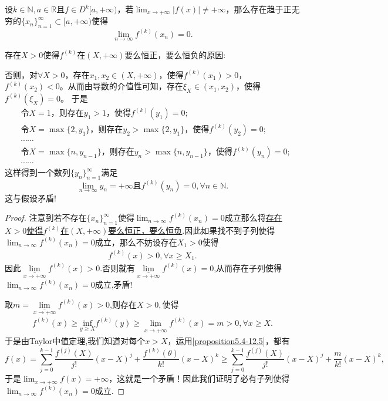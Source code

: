 \documentclass[../../main.tex]{subfiles}%
\begin{document}
\begin{proposition}\label{proposition:函数不爆破则各阶导数必然有趋于 0 的子列}
设\(k\in\mathbb{N},a\in\mathbb{R}\)且\(f\in D^{k}[a,+\infty)\)，若\(\lim_{x\rightarrow +\infty}|f(x)|\neq +\infty\)，那么存在趋于正无穷的\(\{x_n\}_{n = 1}^{\infty}\subset [a,+\infty)\)使得
\[
\lim_{n\rightarrow\infty}f^{(k)}(x_n)=0.
\]
\end{proposition}
\begin{note}
\hypertarget{proposition5.4由假设得到这个结论的原因}{存在\(X > 0\)使得\(f^{(k)}\)在\((X,+\infty)\)要么恒正，要么恒负的原因:}否则，对\(\forall X>0\)，存在\(x_1,x_2\in (X,+\infty)\)，使得\(f^{(k)}(x_1)>0\)，\(f^{(k)}(x_2)<0\)。从而由导数的介值性可知，存在\(\xi_X\in (x_1,x_2)\)，使得\(f^{(k)}(\xi_X) = 0\)。
于是
\begin{align*}
&\text{令}X = 1\text{，则存在}y_1>1\text{，使得}f^{(k)}(y_1)=0;\\
&\text{令}X=\max\{2,y_1\}\text{，则存在}y_2>\max\{2,y_1\}\text{，使得}f^{(k)}(y_2)=0;\\
&\cdots\cdots\\
&\text{令}X=\max\{n,y_{n - 1}\}\text{，则存在}y_n>\max\{n,y_{n - 1}\}\text{，使得}f^{(k)}(y_n)=0;\\
&\cdots\cdots
\end{align*}
这样得到一个数列\(\{y_n\}_{n = 1}^{\infty}\)满足
\[
\lim_{n\rightarrow \infty}y_n=+\infty\text{且}f^{(k)}(y_n)=0,\forall n\in \mathbb{N}.
\]
这与假设矛盾!
\end{note}
\begin{proof}

注意到若不存在\(\{x_n\}_{n = 1}^{\infty}\)使得\(\lim_{n\rightarrow\infty}f^{(k)}(x_n)=0\)成立那么将\hyperlink{proposition5.4由假设得到这个结论的原因}{存在\(X > 0\)使得\(f^{(k)}\)在\((X,+\infty)\)要么恒正，要么恒负}.因此如果找不到子列使得\(\lim_{n\rightarrow\infty}f^{(k)}(x_n)=0\)成立，那么不妨设存在\(X_1> 0\)使得
\begin{align*}
f^{(k)}(x)>0,\forall x\geqslant X_1.
\end{align*}
因此$\underset{x\rightarrow +\infty}{\underline{\lim }}f^{(k)}\left( x \right) >0.$否则就有$\underset{x\rightarrow +\infty}{\underline{\lim }}f^{(k)}\left( x \right) =0$,从而存在子列使得\(\lim_{n\rightarrow\infty}f^{(k)}(x_n)=0\)成立,矛盾!

取$m=\underset{x\rightarrow +\infty}{\underline{\lim }}f^{(k)}\left( x \right) >0$,则存在$X>0,$使得
\begin{align}\label{proposition5.4-12.5}
f^{(k)}(x)\geqslant \underset{y\geqslant X}{\mathrm{inf}}f^{(k)}\left( y \right) \geqslant \underset{x\rightarrow +\infty}{\underline{\lim }}f^{(k)}\left( x \right) =m>0,\forall x\geqslant X.
\end{align}
于是由Taylor中值定理,我们知道对每个\(x > X\)，运用\eqref{proposition5.4-12.5}，都有
\[f(x)=\sum_{j = 0}^{k - 1}\frac{f^{(j)}(X)}{j!}(x - X)^j+\frac{f^{(k)}(\theta)}{k!}(x - X)^k\geqslant\sum_{j = 0}^{k - 1}\frac{f^{(j)}(X)}{j!}(x - X)^j+\frac{m}{k!}(x - X)^k,\]
于是\(\lim_{x\rightarrow +\infty}f(x)=+\infty\)，这就是一个矛盾！因此我们证明了必有子列使得\(\lim_{n\rightarrow\infty}f^{(k)}(x_n)=0\)成立.

\end{proof}
\end{document}
